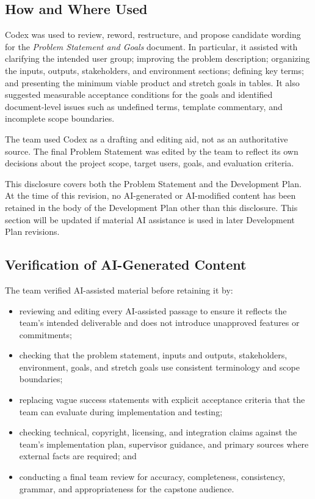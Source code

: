 \documentclass{article}
\begin{document}
\subsection{How and Where Used}
Codex was used to review, reword, restructure, and propose candidate wording
for the \emph{Problem Statement and Goals} document. In particular, it assisted
with clarifying the intended user group; improving the problem description;
organizing the inputs, outputs, stakeholders, and environment sections;
defining key terms; and presenting the minimum viable product and stretch goals
in tables. It also suggested measurable acceptance conditions for the goals and
identified document-level issues such as undefined terms, template commentary,
and incomplete scope boundaries.

The team used Codex as a drafting and editing aid, not as an authoritative
source. The final Problem Statement was edited by the team to reflect its own
decisions about the project scope, target users, goals, and evaluation criteria.

This disclosure covers both the Problem Statement and the Development Plan. At
the time of this revision, no AI-generated or AI-modified content has been
retained in the body of the Development Plan other than this disclosure. This
section will be updated if material AI assistance is used in later Development
Plan revisions.

\subsection{Verification of AI-Generated Content}
The team verified AI-assisted material before retaining it by:
\begin{itemize}
    \item reviewing and editing every AI-assisted passage to ensure it reflects
    the team's intended deliverable and does not introduce unapproved features
    or commitments;
    \item checking that the problem statement, inputs and outputs,
    stakeholders, environment, goals, and stretch goals use consistent
    terminology and scope boundaries;
    \item replacing vague success statements with explicit acceptance criteria
    that the team can evaluate during implementation and testing;
    \item checking technical, copyright, licensing, and integration claims
    against the team's implementation plan, supervisor guidance, and primary
    sources where external facts are required; and
    \item conducting a final team review for accuracy, completeness,
    consistency, grammar, and appropriateness for the capstone audience.
\end{itemize}
\end{document}
